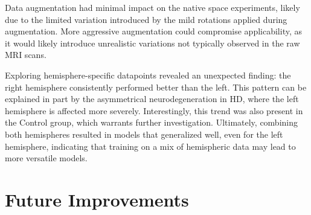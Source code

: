 Data augmentation had minimal impact on the native space experiments, likely due to the limited variation introduced by the mild rotations applied during augmentation. More aggressive augmentation could compromise applicability, as it would likely introduce unrealistic variations not typically observed in the raw \ac{MRI} scans.\par
Exploring hemisphere-specific datapoints revealed an unexpected finding: the right hemisphere consistently performed better than the left. This pattern can be explained in part by the asymmetrical neurodegeneration in \ac{HD}, where the left hemisphere is affected more severely. Interestingly, this trend was also present in the Control group, which warrants further investigation. Ultimately, combining both hemispheres resulted in models that generalized well, even for the left hemisphere, indicating that training on a mix of hemispheric data may lead to more versatile models.\par

\section{Future Improvements}
\label{sec:improve}

